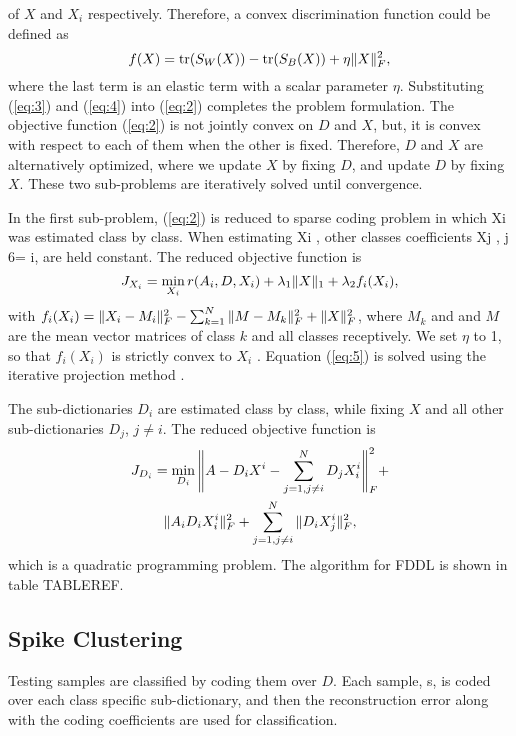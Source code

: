 \documentclass[conference]{IEEEtran}
\begin{document}
	of $X$ and $X_i$ respectively. Therefore, a convex discrimination
	function could be defined as
	\begin{equation}
		\label{eq:4}
		f(X)=\mathrm{tr}(S_W(X))-\mathrm{tr}(S_B(X))+\eta\Vert{X}\Vert_F^2,
	\end{equation}
	where the last term is an elastic term with a scalar parameter $\eta$. Substituting (\ref{eq:3}) and (\ref{eq:4}) into (\ref{eq:2}) completes the problem formulation. The objective function (\ref{eq:2}) is not jointly convex on $D$ and $X$, but, it is convex with respect to each of them when the other is fixed. Therefore, $D$ and $X$ are alternatively optimized, where we update $X$ by fixing $D$, and update $D$ by fixing $X$. These two sub-problems are iteratively solved until convergence.
	
	In the first sub-problem, (\ref{eq:2}) is reduced to sparse coding problem in which Xi was estimated class by class. When estimating Xi , other classes coefficients Xj , j 6= i, are held constant. The reduced objective function is
	\begin{equation}
		\label{eq:5}
		J_{X_i}=\min_{X_i}r(A_i,D,X_i)+\lambda_1\Vert{X}\Vert_1+\lambda_2f_i(X_i),
	\end{equation}
	with $f_i(X_i)=\Vert{X_i-M_i}\Vert_F^2-\sum_{k=1}^{N}\Vert{M-M_k}\Vert_F^2+\Vert{X}\Vert_F^2$, where $M_k$ and and $M$ are the mean vector matrices of class $k$ and all classes receptively. We set $\eta$ to 1, so that $f_i(X_i)$ is strictly convex to $X_i$ . Equation (\ref{eq:5}) is solved using the iterative projection method \cite{yang2011fisher}.
	
	The sub-dictionaries $D_i$ are estimated class by class, while fixing $X$ and all other sub-dictionaries $D_j$, $j\neq i$. The reduced objective function is
	\begin{multline}
		\label{eq:6}
		J_{D_i}=\min_{D_i}\Bigg\Vert{A-D_iX^i-\sum_{j=1,j\neq i}^{N}D_jX_i^i}\Bigg\Vert_F^2 + \\
		\Vert{A_iD_iX_i^i}\Vert_F^2+\sum_{j=1,j\neq i}^{N}\Vert{D_iX_j^i}\Vert_F^2,
	\end{multline}
	which is a quadratic programming problem. The algorithm for FDDL is shown in table TABLEREF.
	
	\subsection{Spike Clustering}
	Testing samples are classified by coding them over $D$. Each sample, s, is coded over each class specific sub-dictionary, and then the reconstruction error along with the coding coefficients are used for classification.
	
\end{document}
